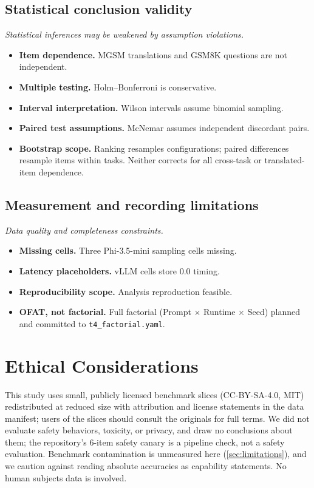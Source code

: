 \subsection{Statistical conclusion validity}
\textit{Statistical inferences may be weakened by assumption violations.}

\begin{itemize}
  \item \textbf{Item dependence.} MGSM translations and GSM8K questions
are not independent.
  \item \textbf{Multiple testing.} Holm--Bonferroni is conservative.
  \item \textbf{Interval interpretation.} Wilson intervals assume
binomial sampling.
  \item \textbf{Paired test assumptions.} McNemar assumes independent
discordant pairs.
  \item \textbf{Bootstrap scope.} Ranking resamples configurations;
paired differences resample items within tasks. Neither corrects for all
cross-task or translated-item dependence.
\end{itemize}

\subsection{Measurement and recording limitations}
\textit{Data quality and completeness constraints.}

\begin{itemize}
  \item \textbf{Missing cells.} Three Phi-3.5-mini sampling cells missing.
  \item \textbf{Latency placeholders.} vLLM cells store 0.0 timing.
  \item \textbf{Reproducibility scope.} Analysis reproduction feasible.
  \item \textbf{OFAT, not factorial.} Full factorial (Prompt $\times$ Runtime $\times$
Seed) planned and committed to \texttt{t4\_factorial.yaml}.
\end{itemize}

\section{Ethical Considerations}
\label{sec:ethics}
This study uses small, publicly licensed benchmark slices (CC-BY-SA-4.0,
MIT) redistributed at reduced size with attribution and license statements
in the data manifest; users of the slices should consult the originals for
full terms. We did not evaluate safety behaviors, toxicity, or privacy, and
draw no conclusions about them; the repository's 6-item safety canary is a
pipeline check, not a safety evaluation. Benchmark contamination is
unmeasured here (\cref{sec:limitations}), and we caution against reading
absolute accuracies as capability statements. No human subjects data is
involved.

